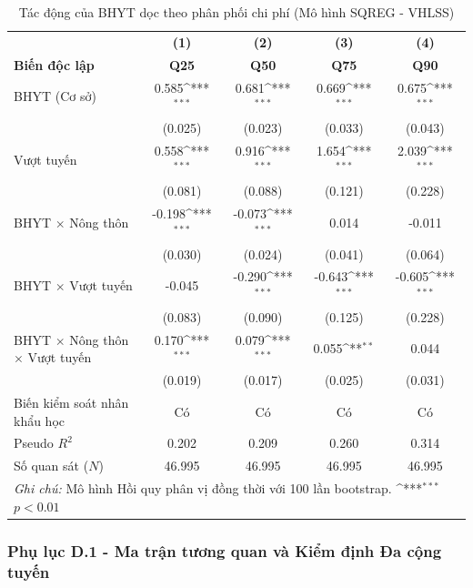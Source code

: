 \documentclass[12pt,a4paper]{article}
\begin{document}
\begin{table}[htbp]
	\centering
	\def\sym#1{\ifmmode^{#1}\else\(^{#1}\)\fi}
	\caption{Tác động của BHYT dọc theo phân phối chi phí (Mô hình SQREG - VHLSS)}
	\label{tab:sqreg_appendix}
	\begin{tabular}{lcccc}
		\toprule
		&\textbf{(1)}&\textbf{(2)}&\textbf{(3)}&\textbf{(4)}\\
		\textbf{Biến độc lập}&\textbf{Q25}&\textbf{Q50}&\textbf{Q75}&\textbf{Q90}\\
		\midrule
		BHYT (Cơ sở) & 0.585\sym{***} & 0.681\sym{***} & 0.669\sym{***} & 0.675\sym{***} \\
		& (0.025) & (0.023) & (0.033) & (0.043) \\
		\addlinespace
		Vượt tuyến & 0.558\sym{***} & 0.916\sym{***} & 1.654\sym{***} & 2.039\sym{***} \\
		& (0.081) & (0.088) & (0.121) & (0.228) \\
		\addlinespace
		BHYT $\times$ Nông thôn & -0.198\sym{***} & -0.073\sym{***} & 0.014 & -0.011 \\
		& (0.030) & (0.024) & (0.041) & (0.064) \\
		\addlinespace
		BHYT $\times$ Vượt tuyến & -0.045 & -0.290\sym{***} & -0.643\sym{***} & -0.605\sym{***} \\
		& (0.083) & (0.090) & (0.125) & (0.228) \\
		\addlinespace
		BHYT $\times$ Nông thôn $\times$ Vượt tuyến & 0.170\sym{***} & 0.079\sym{***} & 0.055\sym{**} & 0.044 \\
		& (0.019) & (0.017) & (0.025) & (0.031) \\
		\midrule
		Biến kiểm soát nhân khẩu học & Có & Có & Có & Có \\
		Pseudo $R^2$ & 0.202 & 0.209 & 0.260 & 0.314 \\
		Số quan sát ($N$) & 46.995 & 46.995 & 46.995 & 46.995 \\
		\bottomrule
		\multicolumn{5}{p{13.5cm}}{\footnotesize \textit{Ghi chú:} Mô hình Hồi quy phân vị đồng thời với 100 lần bootstrap. \sym{***} \(p<0.01\)}
	\end{tabular}
\end{table}

\newpage
\subsubsection{Phụ lục D.1 - Ma trận tương quan và Kiểm định Đa cộng tuyến}
\end{document}
